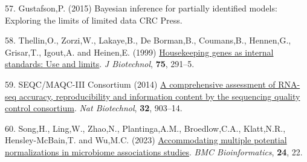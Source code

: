 \documentclass[
]{article}
\newlength{\cslhangindent}
\newenvironment{CSLReferences}[2] %
 {\begin{list}{}{%
  \setlength{\itemindent}{0pt}
  \setlength{\leftmargin}{0pt}
  \setlength{\parsep}{0pt}
  \ifodd #1
   \setlength{\leftmargin}{\cslhangindent}
   \setlength{\itemindent}{-1\cslhangindent}
  \fi
  \setlength{\itemsep}{#2\baselineskip}}}
 {\end{list}}
\begin{document}
\begin{CSLReferences}{1}{1}
57. Gustafson,P. (2015) Bayesian inference for partially identified
models: Exploring the limits of limited data CRC Press.

58. Thellin,O., Zorzi,W., Lakaye,B., De Borman,B., Coumans,B.,
Hennen,G., Grisar,T., Igout,A. and Heinen,E. (1999)
\href{https://www.ncbi.nlm.nih.gov/pubmed/10617337}{Housekeeping genes
as internal standards: Use and limits}. \emph{J Biotechnol},
\textbf{75}, 291--5.

59. SEQC/MAQC-III Consortium (2014)
\href{https://doi.org/10.1038/nbt.2957}{A comprehensive assessment of
RNA-seq accuracy, reproducibility and information content by the
sequencing quality control consortium}. \emph{Nat Biotechnol},
\textbf{32}, 903--14.

60. Song,H., Ling,W., Zhao,N., Plantinga,A.M., Broedlow,C.A.,
Klatt,N.R., Hensley-McBain,T. and Wu,M.C. (2023)
\href{https://doi.org/10.1186/s12859-023-05147-w}{Accommodating multiple
potential normalizations in microbiome associations studies}. \emph{BMC
Bioinformatics}, \textbf{24}, 22.

\end{CSLReferences}
\end{document}

